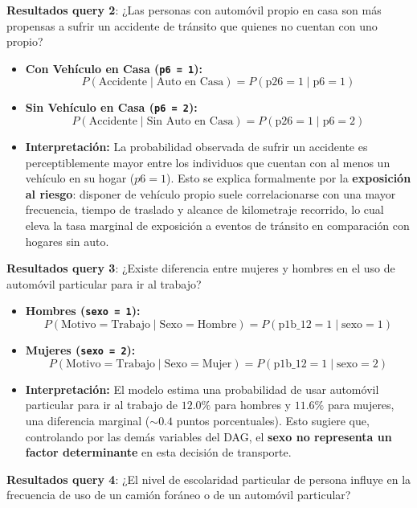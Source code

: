 \documentclass[12pt,a4paper]{article}
\begin{document}
\textbf{Resultados query 2}: ¿Las personas con automóvil propio en casa son más propensas a sufrir un accidente de tránsito que quienes no cuentan con uno propio?
\begin{itemize}
    \item \textbf{Con Vehículo en Casa (\texttt{p6 = 1}):} 
    \[ P(\text{Accidente} \mid \text{Auto en Casa}) = P(\text{p26} = 1 \mid \text{p6} = 1) \]
    \item \textbf{Sin Vehículo en Casa (\texttt{p6 = 2}):} 
    \[ P(\text{Accidente} \mid \text{Sin Auto en Casa}) = P(\text{p26} = 1 \mid \text{p6} = 2) \]
    \item \textbf{Interpretación:} La probabilidad observada de sufrir un accidente es perceptiblemente mayor entre los individuos que cuentan con al menos un vehículo en su hogar ($p6 = 1$). Esto se explica formalmente por la \textbf{exposición al riesgo}: disponer de vehículo propio suele correlacionarse con una mayor frecuencia, tiempo de traslado y alcance de kilometraje recorrido, lo cual eleva la tasa marginal de exposición a eventos de tránsito en comparación con hogares sin auto.
\end{itemize}

\textbf{Resultados query 3}: ¿Existe diferencia entre mujeres y hombres en el uso de automóvil particular para ir al trabajo?
\begin{itemize}
    \item \textbf{Hombres (\texttt{sexo = 1}):}
    \[ P(\text{Motivo} = \text{Trabajo} \mid \text{Sexo} = \text{Hombre}) = P(\text{p1b\_12} = 1 \mid \text{sexo} = 1) \]
    \item \textbf{Mujeres (\texttt{sexo = 2}):}
    \[ P(\text{Motivo} = \text{Trabajo} \mid \text{Sexo} = \text{Mujer}) = P(\text{p1b\_12} = 1 \mid \text{sexo} = 2) \]
    \item \textbf{Interpretación:} El modelo estima una probabilidad de usar automóvil particular para ir al trabajo de $12.0\%$ para hombres y $11.6\%$ para mujeres, una diferencia marginal ($\sim 0.4$ puntos porcentuales). Esto sugiere que, controlando por las demás variables del DAG, el \textbf{sexo no representa un factor determinante} en esta decisión de transporte.
\end{itemize}

\textbf{Resultados query 4}: ¿El nivel de escolaridad particular de persona influye en la frecuencia de uso de un camión foráneo o de un automóvil particular?
\end{document}
